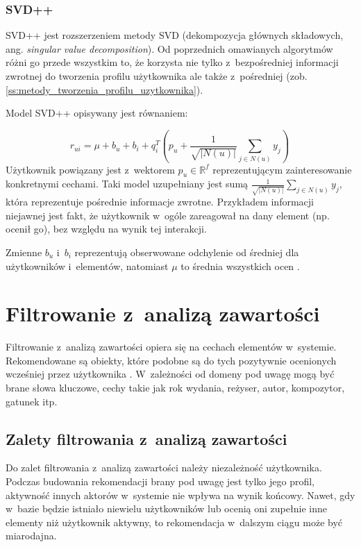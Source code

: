 \documentclass[twoside]{iisthesis}
\begin{document}
	 \subsubsection{SVD++}
	 
	 SVD++ jest rozszerzeniem metody SVD (dekompozycja głównych składowych, ang. \textit{singular value decomposition}). Od poprzednich omawianych algorytmów różni go przede wszystkim to, że korzysta nie tylko z~bezpośredniej informacji zwrotnej do tworzenia profilu użytkownika ale także z~pośredniej (zob. \ref{ss:metody_tworzenia_profilu_uzytkownika}).
	 
	 Model SVD++ opisywany jest równaniem:
	 
	 \begin{equation}
	 \label{eq:svd}
	 r_{ui} = \mu + b_u + b_i + q_i^T (p_u + \frac{1}{\sqrt{|N(u)|}} \sum_{j \in N(u)}^{} y_j) 
	 \,
	 \end{equation}		 		 
	 Użytkownik powiązany jest z~wektorem $p_u \in \mathbb{R} ^f$ reprezentującym zainteresowanie konkretnymi cechami. Taki model uzupełniany jest sumą  $\frac{1}{\sqrt{|N(u)|}} \sum_{j \in N(u)}^{} y_j$, która reprezentuje pośrednie informacje zwrotne. Przykładem informacji niejawnej jest fakt, że użytkownik w~ogóle zareagował na dany element (np. ocenił go), bez względu na wynik tej interakcji. 
	 
	 Zmienne $b_u$ i~$b_i$ reprezentują obserwowane odchylenie od średniej dla użytkowników i~elementów, natomiast $\mu$ to średnia wszystkich ocen \cite{koren2008factorization}. 
	 
	 \section{Filtrowanie z~analizą zawartości}
	 \label{s:filtrowaniezanalizazawartosci}
	 
	 Filtrowanie z~analizą zawartości opiera się na cechach elementów w~systemie. Rekomendowane są obiekty, które podobne są do tych pozytywnie ocenionych wcześniej przez użytkownika \cite{id:huynh2012modeling}. W~zależności od domeny pod uwagę mogą być brane słowa kluczowe, cechy takie jak rok wydania, reżyser, autor, kompozytor, gatunek itp.
	 
	 \subsection{Zalety filtrowania z~analizą zawartości}
	 
	 Do zalet filtrowania z~analizą zawartości należy niezależność użytkownika. Podczas budowania rekomendacji brany pod uwagę jest tylko jego profil, aktywność innych aktorów w~systemie nie wpływa na wynik końcowy. Nawet, gdy w~bazie będzie istniało niewielu użytkowników lub ocenią oni zupełnie inne elementy niż użytkownik aktywny, to rekomendacja w~dalszym ciągu może być miarodajna. 
	 
\end{document}

